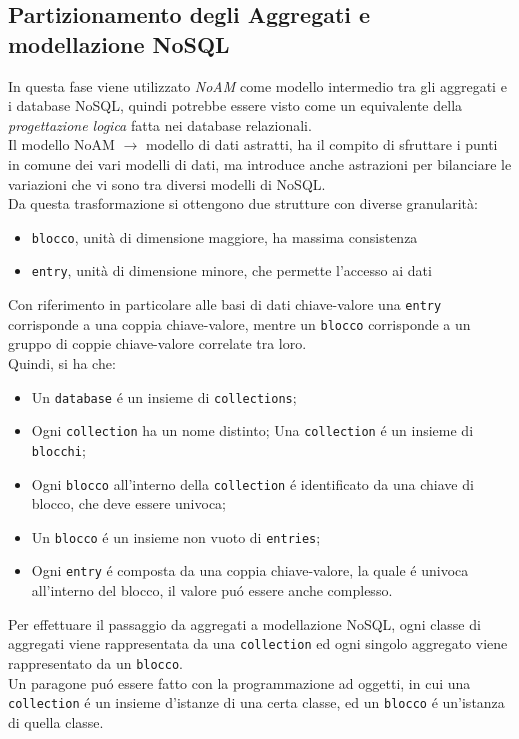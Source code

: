 \subsection{Partizionamento degli Aggregati e modellazione NoSQL}
In questa fase viene utilizzato \emph{NoAM} come modello intermedio tra gli aggregati e i database NoSQL, quindi potrebbe
essere visto come un equivalente della \emph{progettazione logica} fatta nei database relazionali.\\
Il modello NoAM $\to$ modello di dati astratti, ha il compito di sfruttare i punti in comune dei vari modelli di dati, ma
introduce anche astrazioni per bilanciare le variazioni che vi sono tra diversi modelli di NoSQL.\\
Da questa trasformazione si ottengono due strutture con diverse granularità:\\
\begin{itemize}
    \item \texttt{blocco}, unità di dimensione maggiore, ha massima consistenza
    \item \texttt{entry}, unità di dimensione minore, che permette l'accesso ai dati
\end{itemize}
Con riferimento in particolare alle basi di dati chiave-valore una \texttt{entry} corrisponde a una coppia chiave-valore, mentre
un \texttt{blocco} corrisponde a un gruppo di coppie chiave-valore correlate tra loro.\\
Quindi, si ha che:
\begin{itemize}
    \item Un \texttt{database} é un insieme di \texttt{collections};
    \item Ogni \texttt{collection} ha un nome distinto; Una \texttt{collection} é un insieme di \texttt{blocchi};
    \item Ogni \texttt{blocco} all'interno della \texttt{collection} é identificato da una chiave di blocco, che deve essere univoca;
    \item Un \texttt{blocco} é un insieme non vuoto di \texttt{entries};
    \item Ogni \texttt{entry} é composta da una coppia chiave-valore, la quale é univoca all'interno del blocco, il valore puó essere anche complesso.
\end{itemize}
Per effettuare il passaggio da aggregati a modellazione NoSQL, ogni classe di aggregati viene rappresentata da una \texttt{collection} ed
ogni singolo aggregato viene rappresentato da un \texttt{blocco}.\\
Un paragone puó essere fatto con la programmazione ad oggetti, in cui una \texttt{collection} é
un insieme d'istanze di una certa classe, ed un \texttt{blocco} é un'istanza di quella classe.

